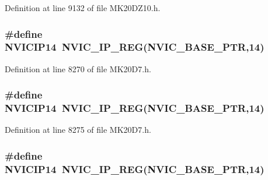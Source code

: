 Definition at line 9132 of file M\+K20\+D\+Z10.\+h.

\subsubsection[{\texorpdfstring{N\+V\+I\+C\+I\+P14}{NVICIP14}}]{\setlength{\rightskip}{0pt plus 5cm}\#define N\+V\+I\+C\+I\+P14~{\bf N\+V\+I\+C\+\_\+\+I\+P\+\_\+\+R\+EG}({\bf N\+V\+I\+C\+\_\+\+B\+A\+S\+E\+\_\+\+P\+TR},14)}\hypertarget{group___n_v_i_c___register___accessor___macros_gab286383a4e3feb0ab833f29186bb3623}{}\label{group___n_v_i_c___register___accessor___macros_gab286383a4e3feb0ab833f29186bb3623}


Definition at line 8270 of file M\+K20\+D7.\+h.

\subsubsection[{\texorpdfstring{N\+V\+I\+C\+I\+P14}{NVICIP14}}]{\setlength{\rightskip}{0pt plus 5cm}\#define N\+V\+I\+C\+I\+P14~{\bf N\+V\+I\+C\+\_\+\+I\+P\+\_\+\+R\+EG}({\bf N\+V\+I\+C\+\_\+\+B\+A\+S\+E\+\_\+\+P\+TR},14)}\hypertarget{group___n_v_i_c___register___accessor___macros_gab286383a4e3feb0ab833f29186bb3623}{}\label{group___n_v_i_c___register___accessor___macros_gab286383a4e3feb0ab833f29186bb3623}


Definition at line 8275 of file M\+K20\+D7.\+h.

\subsubsection[{\texorpdfstring{N\+V\+I\+C\+I\+P14}{NVICIP14}}]{\setlength{\rightskip}{0pt plus 5cm}\#define N\+V\+I\+C\+I\+P14~{\bf N\+V\+I\+C\+\_\+\+I\+P\+\_\+\+R\+EG}({\bf N\+V\+I\+C\+\_\+\+B\+A\+S\+E\+\_\+\+P\+TR},14)}\hypertarget{group___n_v_i_c___register___accessor___macros_gab286383a4e3feb0ab833f29186bb3623}{}\label{group___n_v_i_c___register___accessor___macros_gab286383a4e3feb0ab833f29186bb3623}


